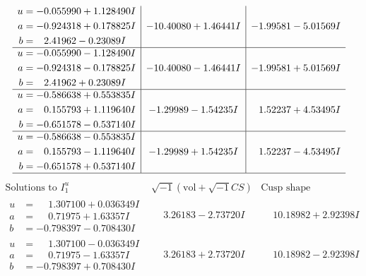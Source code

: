 \documentclass[1p]{elsarticle_modified}
\theoremstyle{definition}
\newcommand{\I}{\sqrt{-1}}
\begin{document}
$$\begin{array}{c|c|c}
\begin{aligned}
u &= -0.055990 + 1.128490 I \\
a &= -0.924318 + 0.178825 I \\
b &= \phantom{-}2.41962 - 0.23089 I\end{aligned}
 & -10.40080 + 1.46441 I & -1.99581 - 5.01569 I \\ \hline\begin{aligned}
u &= -0.055990 - 1.128490 I \\
a &= -0.924318 - 0.178825 I \\
b &= \phantom{-}2.41962 + 0.23089 I\end{aligned}
 & -10.40080 - 1.46441 I & -1.99581 + 5.01569 I \\ \hline\begin{aligned}
u &= -0.586638 + 0.553835 I \\
a &= \phantom{-}0.155793 + 1.119640 I \\
b &= -0.651578 - 0.537140 I\end{aligned}
 & -1.29989 - 1.54235 I & \phantom{-}1.52237 + 4.53495 I \\ \hline\begin{aligned}
u &= -0.586638 - 0.553835 I \\
a &= \phantom{-}0.155793 - 1.119640 I \\
b &= -0.651578 + 0.537140 I\end{aligned}
 & -1.29989 + 1.54235 I & \phantom{-}1.52237 - 4.53495 I\\
 \hline 
 \end{array}$$\newpage$$\begin{array}{c|c|c}  
\text{Solutions to }I^u_{1}& \I (\text{vol} + \sqrt{-1}CS) & \text{Cusp shape}\\
 \hline 
\begin{aligned}
u &= \phantom{-}1.307100 + 0.036349 I \\
a &= \phantom{-}0.71975 + 1.63357 I \\
b &= -0.798397 - 0.708430 I\end{aligned}
 & \phantom{-}3.26183 - 2.73720 I & \phantom{-}10.18982 + 2.92398 I \\ \hline\begin{aligned}
u &= \phantom{-}1.307100 - 0.036349 I \\
a &= \phantom{-}0.71975 - 1.63357 I \\
b &= -0.798397 + 0.708430 I\end{aligned}
 & \phantom{-}3.26183 + 2.73720 I & \phantom{-}10.18982 - 2.92398 I \\ \hline\begin{aligned}

\end{aligned}
\end{array}$$
\end{document}
